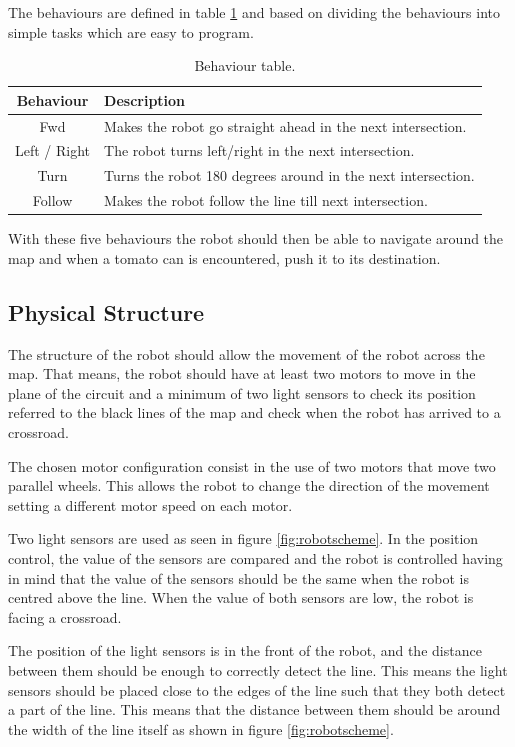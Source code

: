 \documentclass[12pt,a4paper]{article}
\begin{document}
The behaviours are defined in table \ref{tab:behaviourExplained} and based on dividing the behaviours into simple tasks which are easy to program.

\begin{table}[H]
\center
\begin{tabular}{c|l}
Behaviour & Description \\ \hline
Fwd & Makes the robot go straight ahead in the next intersection. \\
Left / Right & The robot turns left/right in the next intersection. \\
Turn & Turns the robot 180 degrees around in the next intersection. \\
Follow & Makes the robot follow the line till next intersection.
\end{tabular}
\caption{Behaviour table.}
\label{tab:behaviourExplained}
\end{table}

With these five behaviours the robot should then be able to navigate around the map and when a tomato can is encountered, push it to its destination.

\subsection{Physical Structure}
The structure of the robot should allow the movement of the robot across the map. 
That means, the robot should have at least two motors to move in the plane of the circuit and a minimum of two light sensors to check its position referred to the black lines of the map and check when the robot has arrived to a crossroad.

The chosen motor configuration consist in the use of two motors that move two parallel wheels. 
This allows the robot to change the direction of the movement setting a different motor speed on each motor.

Two light sensors are used as seen in figure \ref{fig:robotscheme}. 
In the position control, the value of the sensors are compared and the robot is controlled having in mind that the value of the sensors should be the same when the robot is centred above the line.
When the value of both sensors are low, the robot is facing a crossroad.

The position of the light sensors is in the front of the robot, and the distance between them should be enough to correctly detect the line. 
This means the light sensors should be placed close to the edges of the line such that they both detect a part of the line.
This means that the distance between them should be around the width of the line itself as shown in figure \ref{fig:robotscheme}.
\end{document}
